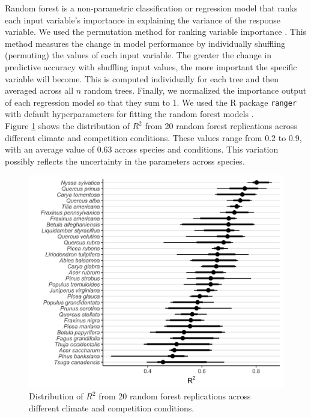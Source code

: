 Random forest is a non-parametric classification or regression model
that ranks each input variable's importance in explaining the variance
of the response variable. We used the permutation method for ranking
variable importance \citep{breiman2001}. This method measures the change
in model performance by individually shuffling (permuting) the values of
each input variable. The greater the change in predictive accuracy with
shuffling input values, the more important the specific variable will
become. This is computed individually for each tree and then averaged
across all \(n\) random trees. Finally, we normalized the importance
output of each regression model so that they sum to 1. We used the R
package \texttt{ranger} with default hyperparameters for fitting the
random forest models \citep{Wright2017}.\\

Figure \ref{fig:rfr2} shows the distribution of \(R^2\) from 20 random
forest replications across different climate and competition conditions.
These values range from 0.2 to 0.9, with an average value of 0.63 across
species and conditions. This variation possibly reflects the uncertainty
in the parameters across species.\\

\hypertarget{fig:rfr2}{%
\begin{figure}
\centering
\includegraphics{manuscript/figs/fig-rfr2-1.png}
\caption[{Distribution of \(R^2\) from 20 random forest replications
across different climate and competition conditions.}]{Distribution of
\(R^2\) from 20 random forest replications across different climate and
competition conditions.}
\label{fig:rfr2}
\end{figure}
}


